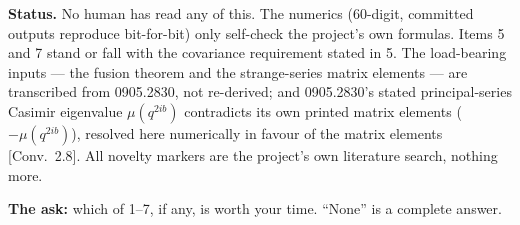 \documentclass[10pt,a4paper]{article}
\newcommand{\loc}[1]{{\small[#1]}}
\begin{document}
\textbf{Status.} No human has read any of this. The numerics (60-digit, committed outputs reproduce bit-for-bit) only self-check the project's own formulas. Items 5 and 7 stand or fall with the covariance requirement stated in 5. The load-bearing inputs --- the fusion theorem and the strange-series matrix elements --- are transcribed from 0905.2830, not re-derived; and 0905.2830's stated principal-series Casimir eigenvalue $\mu(q^{2ib})$ contradicts its own printed matrix elements ($-\mu(q^{2ib})$), resolved here numerically in favour of the matrix elements \loc{Conv.~2.8}. All novelty markers are the project's own literature search, nothing more.

\textbf{The ask:} which of 1--7, if any, is worth your time. ``None'' is a complete answer.
\end{document}
